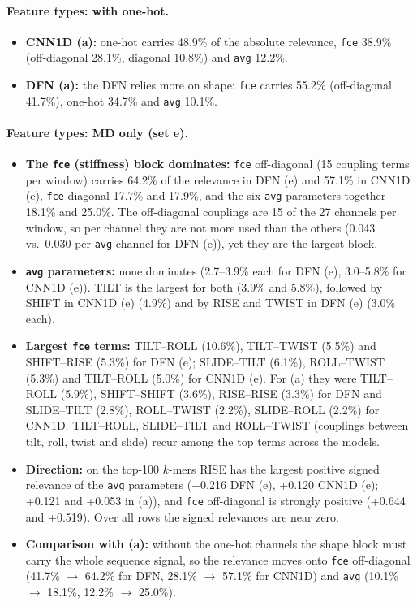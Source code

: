 \paragraph{Feature types: with one-hot.}
\begin{itemize}
\item \textbf{CNN1D (a):} one-hot carries 48.9\% of the absolute relevance, \texttt{fce} 38.9\% (off-diagonal 28.1\%, diagonal 10.8\%) and \texttt{avg} 12.2\%.
\item \textbf{DFN (a):} the DFN relies more on shape: \texttt{fce} carries 55.2\% (off-diagonal 41.7\%), one-hot 34.7\% and \texttt{avg} 10.1\%.
\end{itemize}
\paragraph{Feature types: MD only (set e).}
\begin{itemize}
\item \textbf{The \texttt{fce} (stiffness) block dominates:} \texttt{fce} off-diagonal (15 coupling terms per window) carries 64.2\% of the relevance in DFN (e) and 57.1\% in CNN1D (e), \texttt{fce} diagonal 17.7\% and 17.9\%, and the six \texttt{avg} parameters together 18.1\% and 25.0\%. The off-diagonal couplings are 15 of the 27 channels per window, so per channel they are not more used than the others (0.043 vs.\ 0.030 per \texttt{avg} channel for DFN (e)), yet they are the largest block.
\item \textbf{\texttt{avg} parameters:} none dominates (2.7--3.9\% each for DFN (e), 3.0--5.8\% for CNN1D (e)). TILT is the largest for both (3.9\% and 5.8\%), followed by SHIFT in CNN1D (e) (4.9\%) and by RISE and TWIST in DFN (e) (3.0\% each).
\item \textbf{Largest \texttt{fce} terms:} TILT--ROLL (10.6\%), TILT--TWIST (5.5\%) and SHIFT--RISE (5.3\%) for DFN (e); SLIDE--TILT (6.1\%), ROLL--TWIST (5.3\%) and TILT--ROLL (5.0\%) for CNN1D (e). For (a) they were TILT--ROLL (5.9\%), SHIFT--SHIFT (3.6\%), RISE--RISE (3.3\%) for DFN and SLIDE--TILT (2.8\%), ROLL--TWIST (2.2\%), SLIDE--ROLL (2.2\%) for CNN1D. TILT--ROLL, SLIDE--TILT and ROLL--TWIST (couplings between tilt, roll, twist and slide) recur among the top terms across the models.
\item \textbf{Direction:} on the top-100 $k$-mers RISE has the largest positive signed relevance of the \texttt{avg} parameters (+0.216 DFN (e), +0.120 CNN1D (e); +0.121 and +0.053 in (a)), and \texttt{fce} off-diagonal is strongly positive (+0.644 and +0.519). Over all rows the signed relevances are near zero.
\item \textbf{Comparison with (a):} without the one-hot channels the shape block must carry the whole sequence signal, so the relevance moves onto \texttt{fce} off-diagonal (41.7\% $\to$ 64.2\% for DFN, 28.1\% $\to$ 57.1\% for CNN1D) and \texttt{avg} (10.1\% $\to$ 18.1\%, 12.2\% $\to$ 25.0\%).
\end{itemize}

